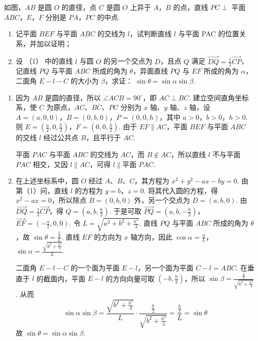 \begin{problem}
如图，\(AB\) 是圆 \(O\) 的直径，点 \(C\) 是圆 \(O\) 上异于 \(A\)，\(B\) 的点，直线 \(PC \perp\) 平面 \(ABC\)，\(E\)，\(F\) 分别是 \(PA\)，\(PC\) 的中点.
\begin{enumerate}
\item 记平面 \(BEF\) 与平面 \(ABC\) 的交线为 \(l\)，试判断直线 \(l\) 与平面 PAC 的位置关系，并加以证明；
\item 设 （1） 中的直线 \(l\) 与圆 \(O\) 的另一个交点为 \(D\)，且点 \(Q\) 满足 \(\overrightarrow{DQ} = \frac{1}{2}\overrightarrow{CP}\)，记直线 \(PQ\) 与平面 \(ABC\) 所成的角为 \(\theta\)，异面直线 \(PQ\) 与 \(EF\) 所成的角为 \(\alpha\)，二面角 \(E - l - C\) 的大小为 \(\beta\)，求证： \(\sin \theta = \sin \alpha \sin \beta\).
\end{enumerate}
\end{problem}

\begin{solution}
\begin{enumerate}
\item 因为 \(AB\) 是圆的直径，所以 \(\angle ACB=90^{\circ}\)，即 \(AC\perp BC\). 建立空间直角坐标系，使 \(C\) 为原点，\(AC\)、\(BC\)、\(PC\) 分别为 \(x\) 轴、\(y\) 轴、\(z\) 轴，设 \(A=(a,0,0)\)，\(B=(0,b,0)\)，\(P=(0,0,h)\)，其中 \(a>0\)，\(b>0\)，\(h>0\).
则 \(E=\left(\frac{a}{2},0,\frac{h}{2}\right)\)，\(F=\left(0,0,\frac{h}{2}\right)\).
由于 \(EF\parallel AC\)，平面 \(BEF\) 与平面 \(ABC\) 的交线 \(l\) 经过公共点 \(B\)，且平行于 \(AC\).

平面 \(PAC\) 与平面 \(ABC\) 的交线为 \(AC\)，而 \(B\notin AC\)，所以直线 \(l\) 不与平面 \(PAC\) 相交，又因 \(l\parallel AC\)，可得 \(l\parallel\text{平面 }PAC\).

\item 在上述坐标系中，圆 \(O\) 经过 \(A\)、\(B\)、\(C\)，其方程为
\(x^2+y^2-ax-by=0\).
由第（1）问，直线 \(l\) 的方程为 \(y=b\)，\(z=0\). 将其代入圆的方程，得 \(x^2-ax=0\)，所以除点 \(B=(0,b,0)\) 外，另一个交点为 \(D=(a,b,0)\). 由 \(\overrightarrow{DQ}=\frac{1}{2}\overrightarrow{CP}\)，得 \(Q=\left(a,b,\frac{h}{2}\right)\).
于是可取 \(\overrightarrow{PQ}=\left(a,b,-\frac{h}{2}\right)\)，\(\overrightarrow{EF}=\left(-\frac{a}{2},0,0\right)\). 令 \(L=\sqrt{a^2+b^2+\frac{h^2}{4}}\). 直线 \(PQ\) 与平面 \(ABC\) 所成的角为 \(\theta\)，故 \(\sin\theta=\frac{\frac{h}{2}}{L}\). 直线 \(EF\) 的方向为 \(x\) 轴方向，因此 \(\cos\alpha=\frac{a}{L}\)，\(\sin\alpha=\frac{\sqrt{b^2+\frac{h^2}{4}}}{L}\).

二面角 \(E-l-C\) 的一个面为平面 \(E-l\)，另一个面为平面 \(C-l=ABC\). 在垂直于 \(l\) 的截面内，平面 \(E-l\) 的方向向量可取 \((-b,\frac{h}{2})\)，所以 \(\sin\beta=\frac{\frac{h}{2}}{\sqrt{b^2+\frac{h^2}{4}}}\).
从而
\[
\sin\alpha\sin\beta
=\frac{\sqrt{b^2+\frac{h^2}{4}}}{L}\cdot
\frac{\frac{h}{2}}{\sqrt{b^2+\frac{h^2}{4}}}
=\frac{\frac{h}{2}}{L}
=\sin\theta
\]
故 \(\sin\theta=\sin\alpha\sin\beta\).
\end{enumerate}
\end{solution}

